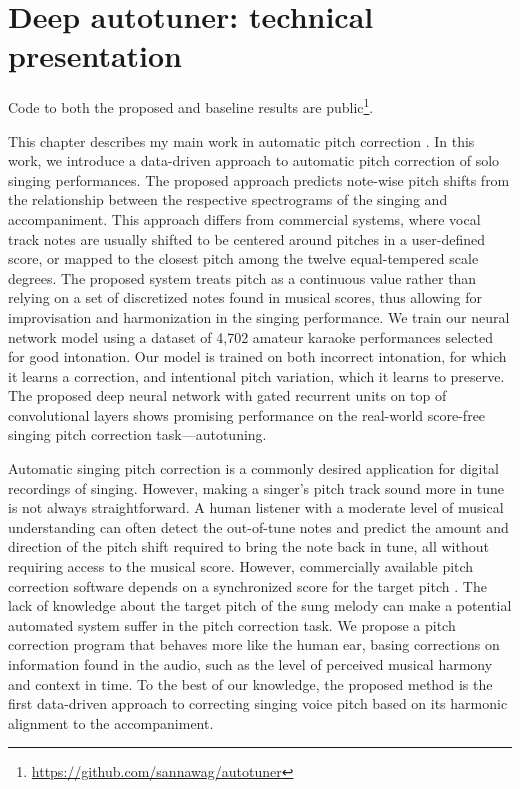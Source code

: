 \chapter{Deep autotuner: technical presentation}
\label{chap:thesis-autotuner}

Code to both the proposed and baseline results are public\footnote{\href{https://github.com/sannawag/autotuner}{https://github.com/sannawag/autotuner}}. 

This chapter describes my main work in automatic pitch correction \cite{wager2020deep}. In this work, we introduce a data-driven approach to automatic pitch correction of solo singing performances. The proposed approach predicts note-wise pitch shifts from the relationship between the respective spectrograms of the singing and accompaniment. This approach differs from commercial systems, where vocal track notes are usually shifted to be centered around pitches in a user-defined score, or mapped to the closest pitch among the twelve equal-tempered scale degrees. The proposed system treats pitch as a continuous value rather than relying on a set of discretized notes found in musical scores, thus allowing for improvisation and harmonization in the singing performance. We train our neural network model using a dataset of 4,702 amateur karaoke performances selected for good intonation. Our model is trained on both incorrect intonation, for which it learns a correction, and intentional pitch variation, which it learns to preserve. The proposed deep neural network with gated recurrent units on top of convolutional layers shows promising performance on the real-world score-free singing pitch correction task---autotuning. 

Automatic singing pitch correction is a commonly desired application for digital recordings of singing. However, making a singer's pitch track sound more in tune is not always straightforward. A human listener with a moderate level of musical understanding can often detect the out-of-tune notes and predict the amount and direction of the pitch shift required to bring the note back in tune, all without requiring access to the musical score. However, commercially available pitch correction software depends on a synchronized score for the target pitch \cite{antares:2016}. The lack of knowledge about the target pitch of the sung melody can make a potential automated system suffer in the pitch correction task. We propose a pitch correction program that behaves more like the human ear, basing corrections on information found in the audio, such as the level of perceived musical harmony and context in time. To the best of our knowledge, the proposed method is the first data-driven approach to correcting singing voice pitch based on its harmonic alignment to the accompaniment.

